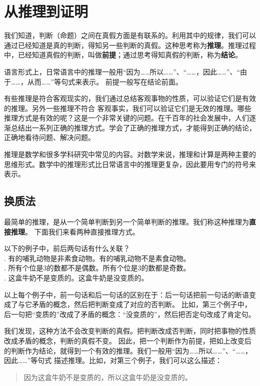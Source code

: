 \documentclass[12pt,UTF8,fontset=none]{ctexbook}
\begin{document}
\chapter{从推理到证明}

我们知道，判断（命题）之间在真假方面是有联系的。利用其中的规律，我们可以通过已经知道是真的判断，得知另一些判断的真假。这种思考称为\textbf{推理}。推理过程中，已经知道真假的判断，叫做\textbf{前提}；通过思考得知真假的判断，称为\textbf{结论}。

语言形式上，日常语言中的推理一般用“因为……所以……”、“……，因此……”、“由于……，从而……”等句式来表示。
前提一般写在结论前面。

有些推理是符合客观现实的，我们通过总结客观事物的性质，可以验证它们是有效的推理。另外一些推理不符合
客观事实，我们可以验证它们是无效的推理。哪些推理方式是有效的呢？这是一个非常关键的问题。在千百年的社会发展中，人们逐渐总结出一系列正确的推理方式。学会了正确的推理方式，才能得到正确的结论，正确地看待问题、解决问题。

推理是数学和很多学科研究中常见的内容。对数学来说，推理和计算是两种主要的思维形式。数学中的推理形式比日常语言中的推理更复杂，因此要用专门的符号来表示。

\section{换质法}

最简单的推理，是从一个简单判断到另一个简单判断的推理。我们称这种推理为\textbf{直接推理}。
下面我们来看两种直接推理方式。

\begin{et}\label{et:2b-0-0} 
    以下的例子中，前后两句话有什么关联？\\
    . 有的哺乳动物是非素食动物。有的哺乳动物不是素食动物。\\
    . 所有个位是$3$的数都不是偶数。所有个位是$3$的数都是奇数。\\
    . 这盒牛奶不是变质的。这盒牛奶是没变质的。
\end{et}
以上每个例子中，前一句话和后一句话的区别在于：后一句话把前一句话的断语变成了与它矛盾的概念，然后把判断变成了对应的否判断。
比如，第三个例子中，后一句把“变质的”改成了矛盾的概念：“没变质的”，然后把否定句改成了肯定句。

我们发现，这种方法不会改变判断的真假。把判断改成否判断，同时把事物的性质改成矛盾的概念，判断的真假不变。
因此，把一个判断作为前提，把如上改变后的判断作为结论，就得到一个有效的推理。我们一般用“因为……所以……”、“……，因此……”等句式
描述推理。比如，对第三个例子，我们可以这么描述：
\begin{quotation}
    因为这盒牛奶不是变质的，所以这盒牛奶是没变质的。
\end{quotation}
\end{document}
